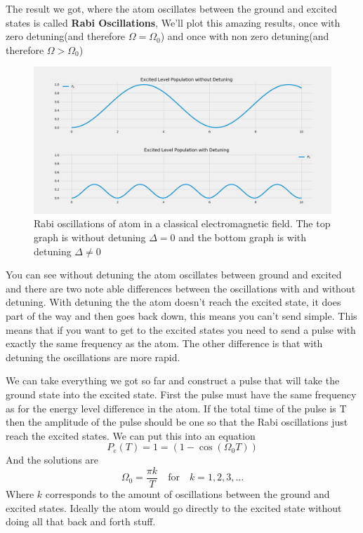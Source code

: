 \documentclass[english, a4paper, 12pt, twoside]{article}
\numberwithin{equation}{section} %
\begin{document}
The result we got, where the atom oscillates between the ground and excited states is called \textbf{Rabi Oscillations}, We'll plot this amazing results, once with zero detuning(and therefore $\Omega = \Omega_0$) and once with non zero detuning(and therefore $\Omega > \Omega_0$)
\begin{figure}[H]
    \centering
    \includegraphics[width=1.0\columnwidth]{Rabi-Oscillations.png}
    \caption{Rabi oscillations of atom in a classical electromagnetic field. The top graph is without detuning $\Delta = 0$ and the bottom graph is with detuning $\Delta \ne 0$}
    \label{fig:rabi-oscillations}
\end{figure}
You can see without detuning the atom oscillates between ground and excited and there are two note able differences between the oscillations with and without detuning. With detuning the the atom doesn't reach the excited state, it does part of the way and then goes back down, this means you can't send simple. This means that if you want  to get to the excited states you need to send a pulse with exactly the same frequency as the atom. The other difference is that with detuning the oscillations are more rapid.

We can take everything we got so far and construct a pulse that will take the ground state into the excited state. First the pulse must have the same frequency as for the energy level difference in the atom. If the total time of the pulse is T then the amplitude of the pulse should be one so that the Rabi oscillations just reach the excited states. We can put this into an equation
\[
    P_e(T) = 1 = (1 - \cos (\Omega_0 T))
\]
And the solutions are
\[
    \Omega_0 = \frac{\pi k}{T} \quad \text{for} \quad k = 1, 2, 3, \dots
\]
Where $k$ corresponds to the amount of oscillations between the ground and excited states. Ideally the atom would go directly to the excited state without doing all that back and forth stuff.
\end{document}
